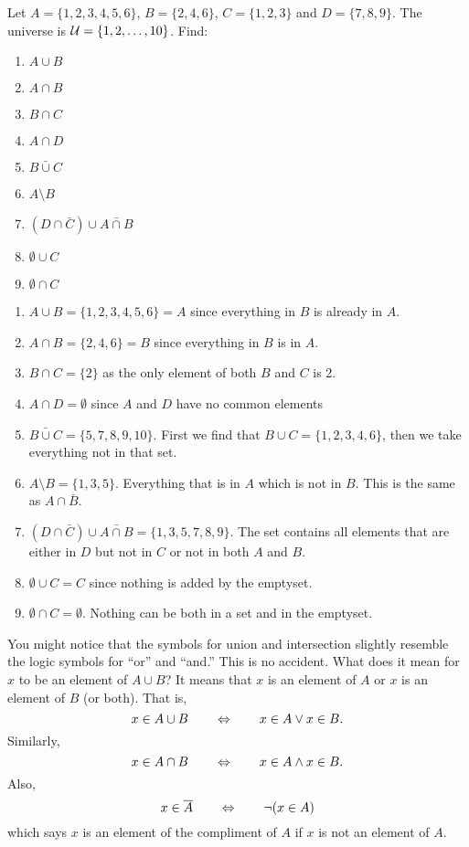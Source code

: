 \documentclass[12pt]{article}
\begin{document}
\begin{example}
 Let $A = \{1, 2, 3, 4, 5, 6\}$, $B = \{2, 4, 6\}$, $C = \{1, 2, 3\}$ and $D = \{7, 8, 9\}$.  The universe is $\mathcal U = \{1, 2, \ldots, 10\}$.  Find:
\begin{multicols}{3}
 \begin{enumerate}
  \item $A \cup B$
\item $A \cap B$
\item $B \cap C$
\item $A \cap D$
\item $\bar{B \cup C}$
\item $A \setminus B$
\item $(D \cap \bar C) \cup \bar{A \cap B}$
\item $\emptyset \cup C$
\item $\emptyset \cap C$
 \end{enumerate}
\end{multicols}
\begin{solution}
  \begin{enumerate}
  \item $A \cup B = \{1, 2, 3, 4, 5, 6\} = A$ since everything in $B$ is already in $A$.
\item $A \cap B = \{2, 4, 6\} = B$ since everything in $B$ is in $A$.
\item $B \cap C = \{2\}$ as the only element of both $B$ and $C$ is 2.
\item $A \cap D = \emptyset$ since $A$ and $D$ have no common elements
\item $\bar{B \cup C} = \{5, 7, 8, 9, 10\}$.  First we find that $B \cup C = \{1, 2, 3, 4, 6\}$, then we take everything not in that set.
\item $A \setminus B = \{1, 3, 5\}$.  Everything that is in $A$ which is not in $B$.  This is the same as $A \cap \bar B$.
\item $(D \cap \bar C) \cup \bar{A \cap B} = \{1, 3, 5, 7, 8, 9\}.$ The set contains all elements that are either in $D$ but not in $C$ or not in both $A$ and $B$.
\item $\emptyset \cup C = C$ since nothing is added by the emptyset.
\item $\emptyset \cap C = \emptyset$.  Nothing can be both in a set and in the emptyset.
 \end{enumerate}
\end{solution}
\end{example}

You might notice that the symbols for union and intersection slightly resemble the logic symbols for ``or'' and ``and.''  This is no accident.  What does it mean for $x$ to be an element of $A\cup B$?  It means that $x$ is an element of $A$ or $x$ is an element of $B$ (or both).  That is,
\[x \in A \cup B \qquad \Leftrightarrow \qquad x \in A \vee x \in B.\]
Similarly,
\[x \in A \cap B \qquad \Leftrightarrow \qquad x \in A \wedge x \in B.\]
Also,
\[x \in \overline A \qquad \Leftrightarrow \qquad \neg (x \in  A)\]
which says $x$ is an element of the compliment of $A$ if $x$ is not an element of $A$.
\end{document}
